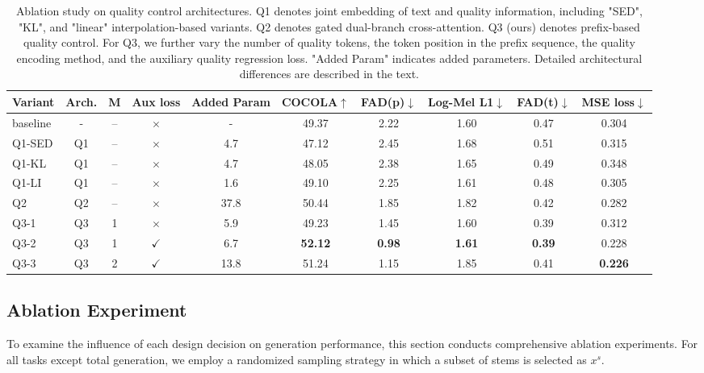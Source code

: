 \documentclass[lettersize,journal]{IEEEtran}
\begin{document}
\begin{table}[t!]
  \centering
\caption{Ablation study on quality control architectures. Q1 denotes joint embedding of text and quality information, including "SED", "KL", and "linear" interpolation-based variants. Q2 denotes gated dual-branch cross-attention. Q3 (ours) denotes prefix-based quality control. For Q3, we further vary the number of quality tokens, the token position in the prefix sequence, the quality encoding method, and the auxiliary quality regression loss. "Added Param" indicates added parameters. Detailed architectural differences are described in the text.}
  \begin{tabular}{lccc|cccccc}
  \toprule
  Variant & Arch. & M & Aux loss & Added Param &COCOLA$\uparrow$ & FAD(p)$\downarrow$ &
  Log-Mel L1$\downarrow$  & FAD(t)$\downarrow$ & MSE loss$\downarrow$\\
  \midrule
  baseline & - & -- & $\times$  & - & 49.37 & 2.22 & 1.60 & 0.47 & 0.304\\ 
  Q1-SED & Q1 & -- & $\times$  & 4.7 & 47.12 & 2.45 & 1.68 & 0.51 & 0.315\\
  Q1-KL  & Q1 & -- & $\times$  & 4.7 & 48.05 & 2.38 & 1.65 & 0.49 & 0.348\\
  Q1-LI  & Q1 & -- & $\times$  & 1.6 & 49.10 & 2.25 & 1.61 & 0.48 & 0.305\\
  Q2     & Q2 & -- & $\times$  & 37.8 & 50.44 & 1.85 & 1.82 & 0.42 & 0.282\\
  Q3-1   & Q3 & 1 & $\times$  & 5.9 & 49.23 & 1.45 & 1.60 & 0.39 & 0.312\\
  Q3-2   & Q3 & 1 & $\checkmark$  & 6.7 & \textbf{52.12} & \textbf{0.98} & \textbf{1.61} & \textbf{0.39} & 0.228\\
  Q3-3   & Q3 & 2 & $\checkmark$  & 13.8 & 51.24 & 1.15 & 1.85 & 0.41 & \textbf{0.226}\\
  \bottomrule
  \end{tabular}
  \label{tab:quality_architecture_ablation}
\end{table}

\subsection{Ablation Experiment}
To examine the influence of each design decision on generation performance, this section conducts comprehensive ablation experiments. For all tasks except total generation, we employ a randomized sampling strategy in which a subset of stems is selected as $x^s$.
\end{document}
